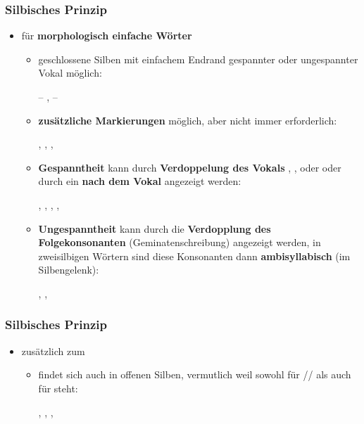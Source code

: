 \begin{frame}
\frametitle{Silbisches Prinzip}

\begin{itemize}
	\item für \textbf{morphologisch einfache Wörter}
	
	\begin{itemize}
		\item geschlossene Silben mit einfachem Endrand \ras gespannter oder ungespannter Vokal möglich:
		
		\ea {} -- ,  -- 
		\z

\pause 
		
		\item \textbf{zusätzliche Markierungen} möglich, aber nicht immer erforderlich: 
		
		\ea {}, , , 
		\z

\pause 
	
		\item \textbf{Gespanntheit} kann durch \textbf{Verdoppelung des Vokals} , ,  oder  oder durch ein  \textbf{nach dem Vokal} angezeigt werden: 
		
		\ea {}, , , , 
		\z

\pause 
		
		\item \textbf{Ungespanntheit} kann durch die \textbf{Verdopplung des Folgekonsonanten} (Geminatenschreibung) angezeigt werden, in zweisilbigen Wörtern sind diese Konsonanten dann \textbf{ambisyllabisch} (im Silbengelenk): 
		
		\ea {}, , 
		\z
	\end{itemize}
\end{itemize}

\end{frame}


\begin{frame}
\frametitle{Silbisches Prinzip}

\begin{itemize}
	\item zusätzlich zum 
	
	\begin{itemize}
	
		\item {} findet sich auch in offenen Silben, vermutlich weil  sowohl für /\textschwa{}/ als auch für  steht:
		
		\ea {}, , , %
		\z
		
	\end{itemize}
\end{itemize}

\end{frame}



